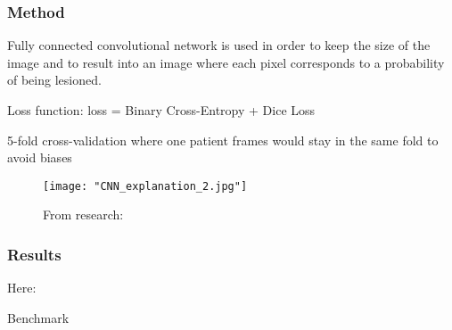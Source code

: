 \subsubsection{Method}

Fully connected convolutional network is used in order to keep the size of the image and to result into an image where each pixel corresponds to a probability of being lesioned.

Loss function: loss = Binary Cross-Entropy + Dice Loss

5-fold cross-validation where one patient frames would stay in the same fold to avoid biases

\begin{table}
	\centering
	\caption{Interesting values of }
\end{table}

\begin{figure}[htbp]
	\centering
	\texttt{[image: "CNN\_explanation\_2.jpg"]}
	\caption{From research: }
	\label{fig:res4:3}
\end{figure}

\subsubsection{Results}

Here: 

\begin{table}[htbp]
	\centering
	\caption{Benchmark}

	\caption{Results from: }
	\label{tab:res4}
\end{table}

